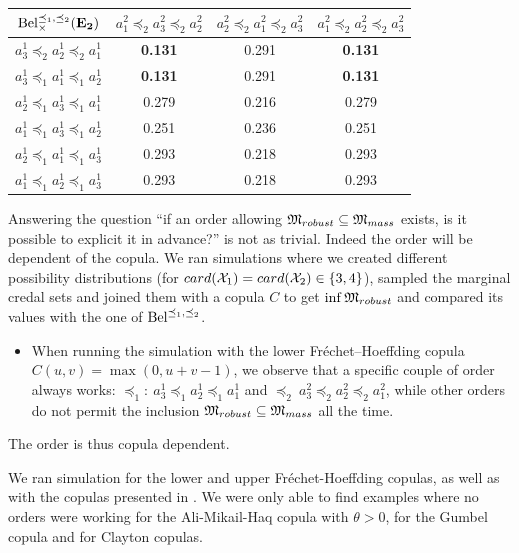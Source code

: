 \begin{example}
\begin{center}
\begin{tabular}{|c||c|c|c|}
\hline
$\mathrm{Bel}^{\preceq_1,\preceq_2}_\times(\mathbf{E_2})$ & $a^2_1\preceq_2a^2_3\preceq_2a^2_2$ & $a^2_2\preceq_2a^2_1\preceq_2a^2_3$ & $a^2_1\preceq_2a^2_2\preceq_2a^2_3$ \\ \hline\hline
$a^1_3\preceq_2a^1_2\preceq_2a^1_1$ & \textbf{0.131} & 0.291 & \textbf{0.131} \\ \hline
$a^1_3\preceq_1a^1_1\preceq_1a^1_2$ & \textbf{0.131} & 0.291 & \textbf{0.131} \\ \hline
$a^1_2\preceq_1a^1_3\preceq_1a^1_1$ & 0.279 & 0.216 & 0.279 \\ \hline
$a^1_1\preceq_1a^1_3\preceq_1a^1_2$ & 0.251 & 0.236 & 0.251 \\ \hline
$a^1_2\preceq_1a^1_1\preceq_1a^1_3$ & 0.293 & 0.218 & 0.293 \\ \hline
$a^1_1\preceq_1a^1_2\preceq_1a^1_3$ & 0.293 & 0.218 & 0.293 \\ \hline
\end{tabular}
\label{tab:beliefs_orders}
\end{center}

Answering the question ``if an order allowing $\mathfrak{M}_{robust}\subseteq\mathfrak{M}_{mass}$ exists, is it possible to explicit it in advance?'' is not as trivial. Indeed the order will be dependent of the copula. We ran simulations where we created different possibility distributions (for $card(\mathcal{X}_1)=card(\mathcal{X}_2)\in\{3,4\}$), sampled the marginal credal sets and joined them with a copula $C$ to get $\inf\mathfrak{M}_{robust}$ and compared its values with the one of $\mathrm{Bel}^{\preceq_1,\preceq_2}$.
\begin{itemize}
	\item When running the simulation with the lower Fréchet–Hoeffding copula $C(u,v)=\max(0,u+v-1)$, we observe that a specific couple of order always works: $\preceq_1:~a^1_3\preceq_1a^1_2\preceq_1a^1_1$ and $\preceq_2~a^2_3\preceq_2a^2_2\preceq_2a^2_1$, while other orders do not permit the inclusion $\mathfrak{M}_{robust}\subseteq\mathfrak{M}_{mass}$ all the time.
\end{itemize}
The order is thus copula dependent.

We ran simulation for the lower and upper Fréchet-Hoeffding copulas, as well as with the copulas presented in . We were only able to find examples where no orders were working for the Ali-Mikail-Haq copula with $\theta>0$, for the Gumbel copula and for Clayton copulas. 
\end{example}
